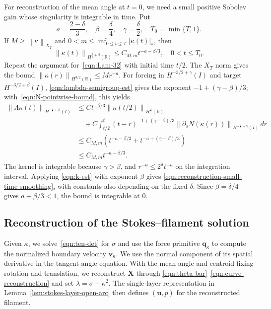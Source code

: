 \documentclass[11pt,reqno]{amsart}
\theoremstyle{plain}
\theoremstyle{definition}
\numberwithin{equation}{section}
\newcommand{\paren}[1]{\left(#1\right)}
\newcommand{\p}{\partial}
\newcommand{\bm}[1]{\boldsymbol{#1}}
\newcommand{\abs}[1]{\left\lvert #1 \right\rvert}
\newcommand{\norm}[1]{\left\lVert #1 \right\rVert}
\newcommand{\R}{\mathbb{R}}
\newcommand{\hi}[1]{H^{#1}(I)}
\newcommand{\hr}[1]{H^{#1}(\R)}
\begin{document}
For reconstruction of the mean angle at $t=0$, we need a small positive
Sobolev gain whose singularity is integrable in time. Put
\begin{equation*}
    a=\frac{2-\delta}{3},\quad
    \beta=\frac{\delta}{4},\quad
    \gamma=\frac{\delta}{2},\quad T_0=\min\{T,1\}.
\end{equation*}
If $M\ge\norm{\kappa}_{X_T}$ and
$0<m\le\inf_{0\le t\le T}\abs{\kappa(t)}_*$, then
\begin{equation}\label{eqn:reconstruction-small-time-smoothing}
    \norm{\kappa(t)}_{\hr{\frac32+\beta}}
    \le C_{M,m}t^{-a-\beta/3},
    \quad 0<t\le T_0.
\end{equation}
Repeat the argument for~\eqref{eqn:Lam-32} with initial time $t/2$.
The $X_T$ norm gives the bound $\norm{\kappa(r)}_{\hr{3/2}}\le Mr^{-a}$.
For forcing in $H^{-3/2+\gamma}(I)$ and target $H^{-3/2+\beta}(I)$,
\eqref{eqn:lambda-semigroup-est} gives the exponent
$-1+(\gamma-\beta)/3$; with~\eqref{eqn:N-pointwise-bound}, this yields
\begin{equation*}
\begin{aligned}
    \norm{\Lambda\kappa(t)}_{\hi{-\frac32+\beta}}
    &\le Ct^{-\beta/3}\norm{\kappa(t/2)}_{\hr{\frac32}}\\
    &\quad+C\int_{t/2}^t
        (t-r)^{-1+(\gamma-\beta)/3}
        \norm{\p_sN(\kappa(r))}_{\hi{-\frac32+\gamma}}\,dr\\
    &\le C_{M,m}\paren{
        t^{-a-\beta/3}+t^{-a+(\gamma-\beta)/3}}\\
    &\le C_{M,m}t^{-a-\beta/3}.
\end{aligned}
\end{equation*}
The kernel is integrable because $\gamma>\beta$, and $r^{-a}\le
2^at^{-a}$ on the integration interval. Applying
\eqref{eqn:k-est} with exponent $\beta$ gives
\eqref{eqn:reconstruction-small-time-smoothing}, with constants also
depending on the fixed $\delta$. Since $\beta=\delta/4$ gives
$a+\beta/3<1$, the bound is integrable at $0$.

\subsection{Reconstruction of the Stokes--filament solution}
\label{subsec:reconstruction-proof}

Given $\kappa$, we solve~\eqref{eqn:ten-det} for $\sigma$ and use the force
primitive $\bm q_\kappa$ to compute the normalized boundary velocity
$\bm v_\kappa$. We use the normal component of its spatial derivative in
the tangent-angle equation. With the mean angle and centroid fixing rotation
and translation, we reconstruct $\bm X$ through
\eqref{eqn:theta-bar}--\eqref{eqn:curve-reconstruction} and set
$\lambda=\sigma-\kappa^2$. The single-layer representation in
Lemma~\ref{lem:stokes-layer-open-arc} then defines $(\bm u,p)$ for the
reconstructed filament.
\end{document}
